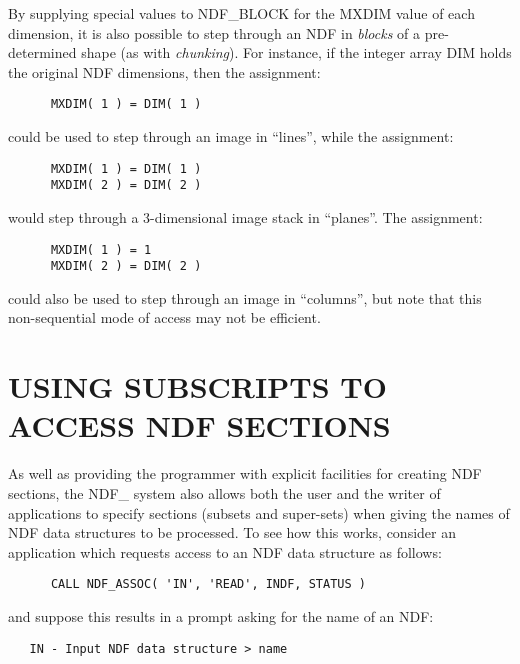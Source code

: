 \documentclass[twoside,11pt]{article}
\newcommand{\xlabel}[1]{}
\newcommand{\st}[1]{{\em{#1}}}
\begin{document}
By supplying special values to NDF\_BLOCK for the MXDIM value of each
dimension, it is also possible to step through an NDF in \st{blocks\/}
of a pre-determined shape (as with \st{chunking\/}). For instance, if
the integer array DIM holds the original NDF dimensions, then the
assignment:

\small
\begin{verbatim}
      MXDIM( 1 ) = DIM( 1 )
\end{verbatim}
\normalsize

could be used to step through an image in ``lines'', while the
assignment:

\small
\begin{verbatim}
      MXDIM( 1 ) = DIM( 1 )
      MXDIM( 2 ) = DIM( 2 )
\end{verbatim}
\normalsize

would step through a 3-dimensional image stack in ``planes''. The assignment:

\small
\begin{verbatim}
      MXDIM( 1 ) = 1
      MXDIM( 2 ) = DIM( 2 )
\end{verbatim}
\normalsize

could also be used to step through an image in ``columns'', but note
that this non-sequential mode of access may not be efficient.


\section{\xlabel{using_subscripts_to_access_ndf_sections}\label{ss:sectionsbyname}USING SUBSCRIPTS TO ACCESS NDF SECTIONS}

As well as providing the programmer with explicit facilities for
creating NDF sections, the NDF\_ system also allows both the user and
the writer of applications to specify sections (subsets and
super-sets) when giving the names of NDF data structures to be
processed. To see how this works, consider an application which
requests access to an NDF data structure as follows:

\small
\begin{verbatim}
      CALL NDF_ASSOC( 'IN', 'READ', INDF, STATUS )
\end{verbatim}
\normalsize

and suppose this results in a prompt asking for the name of an NDF:

\small
\begin{verbatim}
   IN - Input NDF data structure > name
\end{verbatim}
\normalsize
\end{document}
